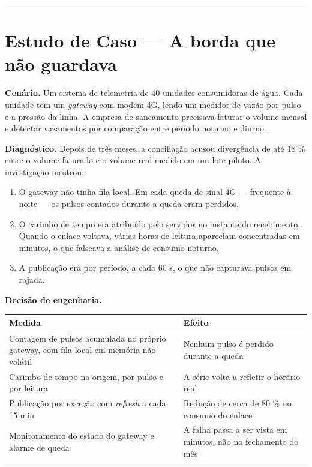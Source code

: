 \begin{center}\rule{0.5\linewidth}{0.5pt}\end{center}

\section{\texorpdfstring{Estudo de Caso --- A borda que não guardava}{Estudo de Caso  A borda que não guardava}}\label{estudo-de-caso-a-borda-que-nuxe3o-guardava}

\textbf{Cenário.} Um sistema de telemetria de 40 unidades consumidoras de água. Cada unidade tem um
\emph{gateway} com modem 4G, lendo um medidor de vazão por pulso e a pressão da linha. A empresa de
saneamento precisava faturar o volume mensal e detectar vazamentos por comparação entre período
noturno e diurno.

\textbf{Diagnóstico.} Depois de três meses, a conciliação acusou divergência de até 18 \% entre o volume
faturado e o volume real medido em um lote piloto. A investigação mostrou:

\begin{enumerate}
\def\labelenumi{\arabic{enumi}.}
\tightlist
\item
  O gateway não tinha fila local. Em cada queda de sinal 4G --- frequente à noite --- os pulsos
  contados durante a queda eram perdidos.
\item
  O carimbo de tempo era atribuído pelo servidor no instante do recebimento. Quando o enlace
  voltava, várias horas de leitura apareciam concentradas em minutos, o que falseava a análise de
  consumo noturno.
\item
  A publicação era por período, a cada 60 s, o que não capturava pulsos em rajada.
\end{enumerate}

\textbf{Decisão de engenharia.}

\begin{longtable}[]{@{}
  >{\raggedright\arraybackslash}p{}
  >{\raggedright\arraybackslash}p{}@{}}
\toprule\noalign{}
\begin{minipage}[b]{\linewidth}\raggedright
Medida
\end{minipage} & \begin{minipage}[b]{\linewidth}\raggedright
Efeito
\end{minipage} \\
\midrule\noalign{}
\endhead
\bottomrule\noalign{}
\endlastfoot
Contagem de pulsos acumulada no próprio gateway, com fila local em memória não volátil & Nenhum pulso é perdido durante a queda \\
Carimbo de tempo na origem, por pulso e por leitura & A série volta a refletir o horário real \\
Publicação por exceção com \emph{refresh} a cada 15 min & Redução de cerca de 80 \% no consumo do enlace \\
Monitoramento do estado do gateway e alarme de queda & A falha passa a ser vista em minutos, não no fechamento do mês \\
\end{longtable}

